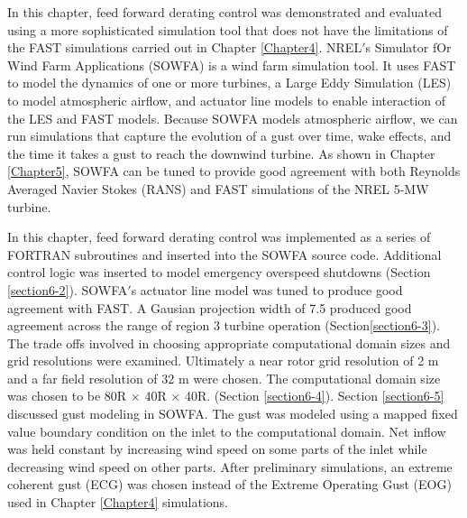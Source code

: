 In this chapter, feed forward derating control was demonstrated and evaluated using a more sophisticated simulation tool that does not have the limitations of the FAST simulations carried out in Chapter \ref{Chapter4}. NREL$'$s Simulator fOr Wind Farm Applications (SOWFA) is a wind farm simulation tool. It uses FAST to model the dynamics of one or more turbines, a Large Eddy Simulation (LES) to model atmospheric airflow, and actuator line models to enable interaction of the LES and FAST models. Because SOWFA models atmospheric airflow, we can run simulations that capture the evolution of a gust over time, wake effects, and the time it takes a gust to reach the downwind turbine. As shown in Chapter \ref{Chapter5}, SOWFA can be tuned to provide good agreement with both Reynolds Averaged Navier Stokes (RANS) and FAST simulations of the NREL 5-MW turbine. 

In this chapter, feed forward derating control was implemented as a series of FORTRAN subroutines and inserted into the SOWFA source code. Additional control logic was inserted to model emergency overspeed shutdowns (Section \ref{section6-2}). SOWFA$'$s actuator line model was tuned to produce good agreement with FAST. A Gausian projection width of 7.5 produced good agreement across the range of region 3 turbine operation (Section\ref{section6-3}). The trade offs involved in choosing appropriate computational domain sizes and grid resolutions were examined. Ultimately a near rotor grid resolution of 2 m and a far field resolution of 32 m were chosen. The computational domain size was chosen to be 80R $\times$ 40R $\times$ 40R. (Section \ref{section6-4}). Section \ref{section6-5} discussed gust modeling in SOWFA. The gust was modeled using a mapped fixed value boundary condition on the inlet to the computational domain. Net inflow was held constant by increasing wind speed on some parts of the inlet while decreasing wind speed on other parts. After preliminary simulations, an extreme coherent gust (ECG) was chosen instead of the Extreme Operating Gust (EOG) used in Chapter \ref{Chapter4} simulations.

